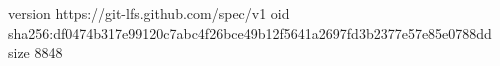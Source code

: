 version https://git-lfs.github.com/spec/v1
oid sha256:df0474b317e99120c7abc4f26bce49b12f5641a2697fd3b2377e57e85e0788dd
size 8848
